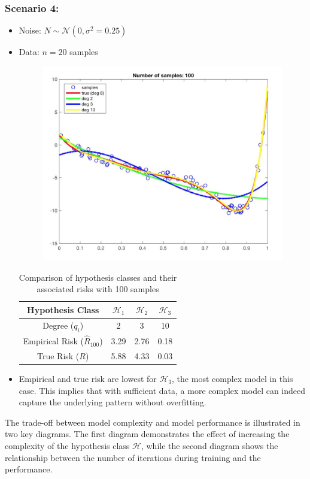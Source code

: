 \subsubsection*{Scenario 4:}
\begin{itemize}
    \item Noise: \( N\sim \mathcal{N}(0, \sigma^2 = 0.25) \)
    \item Data: \( n=20 \) samples
    \begin{figure}[H]
    \centering
    \includegraphics[width=0.55\linewidth]{img/3_100samp.png}
    \label{fig:poly_fit_100samp}
\end{figure}
    \begin{table}[H]
        \centering
        \begin{tabular}{cccc}
            \hline
            \textbf{Hypothesis Class} & \( \mathcal{H}_1 \) & \( \mathcal{H}_2 \) & \( \mathcal{H}_3 \) \\
            \hline
            Degree (\( q_i \)) & 2 & 3 & 10 \\
            Empirical Risk (\( \hat{R}_{100} \)) & 3.29 & 2.76 & 0.18 \\
            True Risk (\( R \)) & 5.88 & 4.33 & 0.03 \\
            \hline
        \end{tabular}
        \caption{Comparison of hypothesis classes and their associated risks with 100 samples}
        \label{tab:hypothesis_risks_100samp}
    \end{table}
    \item Empirical and true risk are lowest for \( \mathcal{H}_3 \), the most complex model in this case. This implies that with sufficient data, a more complex model can indeed capture the underlying pattern without overfitting.
\end{itemize}



The trade-off between model complexity and model performance is illustrated in two key diagrams. The first diagram demonstrates the effect of increasing the complexity of the hypothesis class \( \mathcal{H} \), while the second diagram shows the relationship between the number of iterations during training and the performance.

